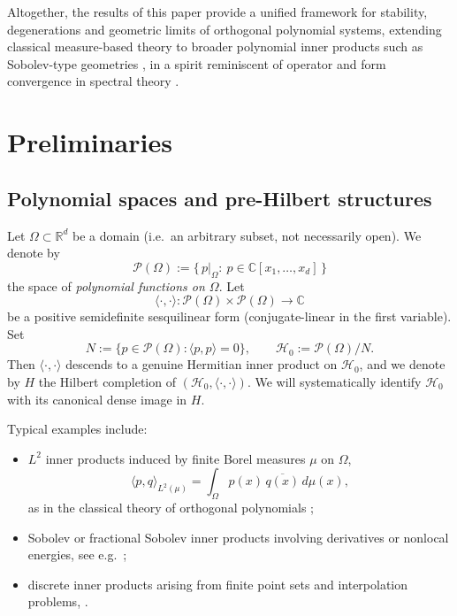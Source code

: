 \documentclass{amsart}
\numberwithin{equation}{section}
\theoremstyle{definition}
\theoremstyle{remark}
\begin{document}
Altogether, the results of this paper provide a unified framework for stability,
degenerations and geometric limits of orthogonal polynomial systems, extending classical
measure-based theory \cite{Szego,Chihara,Ismail,SimonOPUC1,SimonOPUC2}
to broader polynomial inner products such as Sobolev-type geometries
\cite{IserlesSobolev,MarcellanSobolev},
in a spirit reminiscent of operator and form convergence in spectral theory
\cite{Kato,Mosco,KuwaeShioya}.


\section{Preliminaries}

\subsection{Polynomial spaces and pre-Hilbert structures}

Let $\Omega\subset\mathbb R^d$ be a domain (i.e.\ an arbitrary subset, not necessarily open).
We denote by
\[
\mathcal P(\Omega):=\{\,p|_\Omega:\ p\in\mathbb C[x_1,\dots,x_d]\,\}
\]
the space of \emph{polynomial functions on $\Omega$}.
Let
\[
\langle\cdot,\cdot\rangle:\mathcal P(\Omega)\times\mathcal P(\Omega)\to\mathbb C
\]
be a positive semidefinite sesquilinear form (conjugate-linear in the first variable).
Set
\[
N:=\{p\in\mathcal P(\Omega):\langle p,p\rangle=0\},\qquad
\mathcal H_0:=\mathcal P(\Omega)/N.
\]
Then $\langle\cdot,\cdot\rangle$ descends to a genuine Hermitian inner product on $\mathcal H_0$,
and we denote by $H$ the Hilbert completion of $(\mathcal H_0,\langle\cdot,\cdot\rangle)$.
We will systematically identify $\mathcal H_0$ with its canonical dense image in $H$.

Typical examples include:
\begin{itemize}[leftmargin=2em]
  \item $L^2$ inner products induced by finite Borel measures $\mu$ on $\Omega$,
  \[
  \langle p,q\rangle_{L^2(\mu)}=\int_\Omega p(x)\,\overline{q(x)}\,d\mu(x),
  \]
  as in the classical theory of orthogonal polynomials \cite{Szego,Chihara,SimonOPUC1,SimonOPUC2};
  \item Sobolev or fractional Sobolev inner products involving derivatives or nonlocal energies,
  see e.g.\ \cite{MarcellanXu,MarcellanXuSurvey};
  \item discrete inner products arising from finite point sets and interpolation problems,
  \cite{deBoorRon,XuInterpolation}.
\end{itemize}
\end{document}
